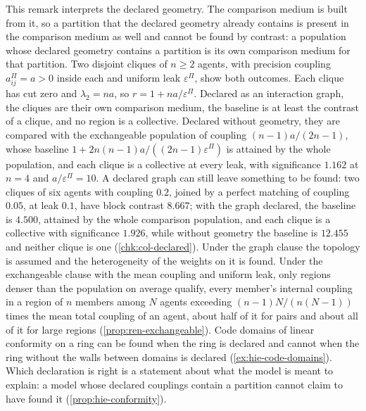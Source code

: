 \begin{remark}\label{rem:col-declared-geometry}
This remark interprets the declared geometry. The comparison medium is built from it, so a partition that the declared geometry already contains is present in the comparison medium as well and cannot be found by contrast: a population whose declared geometry contains a partition is its own comparison medium for that partition. Two disjoint cliques of $n\ge2$ agents, with precision coupling $a^\Pi_{ij}=a>0$ inside each and uniform leak $\varepsilon^\Pi$, show both outcomes. Each clique has cut zero and $\lambda_2=na$, so $r=1+na/\varepsilon^\Pi$. Declared as an interaction graph, the cliques are their own comparison medium, the baseline is at least the contrast of a clique, and no region is a collective. Declared without geometry, they are compared with the exchangeable population of coupling $(n-1)a/(2n-1)$, whose baseline $1+2n(n-1)a/((2n-1)\varepsilon^\Pi)$ is attained by the whole population, and each clique is a collective at every leak, with significance $1.162$ at $n=4$ and $a/\varepsilon^\Pi=10$. A declared graph can still leave something to be found: two cliques of six agents with coupling $0.2$, joined by a perfect matching of coupling $0.05$, at leak $0.1$, have block contrast $8.667$; with the graph declared, the baseline is $4.500$, attained by the whole comparison population, and each clique is a collective with significance $1.926$, while without geometry the baseline is $12.455$ and neither clique is one (\cref{chk:col-declared}). Under the graph clause the topology is assumed and the heterogeneity of the weights on it is found. Under the exchangeable clause with the mean coupling and uniform leak, only regions denser than the population on average qualify, every member's internal coupling in a region of $n$ members among $N$ agents exceeding $(n-1)N/(n(N-1))$ times the mean total coupling of an agent, about half of it for pairs and about all of it for large regions (\cref{prop:ren-exchangeable}). Code domains of linear conformity on a ring can be found when the ring is declared and cannot when the ring without the walls between domains is declared (\cref{ex:hie-code-domains}). Which declaration is right is a statement about what the model is meant to explain: a model whose declared couplings contain a partition cannot claim to have found it (\cref{prop:hie-conformity}).
\end{remark}

